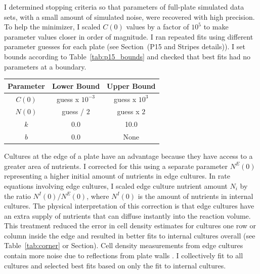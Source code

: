 I determined stopping criteria so that parameters of full-plate
simulated data sets, with a small amount of simulated noise, were
recovered with high precision. To help the minimizer, I scaled
\(C(0)\) values by a factor of \(10^{5}\) to make parameter
values closer in order of magnitude. I ran repeated fits using
different parameter guesses for each plate (see Section~(P15 and
Stripes details)). I set bounds according to
Table~\ref{tab:p15_bounds} and checked that best fits had no
parameters at a boundary.
%

\begin{center}
  \begin{tabular}{| c | c c |}
    \hline
    Parameter        & Lower Bound  & Upper Bound \\
    \hline
    \(C(0)\)     & guess x \(10^{-3}\)  & guess x \(10^{3}\)\\
    \(N(0)\)     & guess / \(2\)  & guess x \(2\)\\
    \(k\)        & 0.0    & 10.0\\
    \(b\)           & 0.0    & None \\
    \hline
  \end{tabular}
  \label{tab:p15_bounds}
\end{center}
%
Cultures at the edge of a plate have an advantage because they have
access to a greater area of nutrients. I corrected for this using a
separate parameter \(N^{E}(0)\) representing a higher initial
amount of nutrients in edge cultures. In rate equations involving edge
cultures, I scaled edge culture nutrient amount \(N_{i}\) by the ratio
\(N^{I}(0)/N^{E}(0)\), where \(N^{I}(0)\) is the amount
of nutrients in internal cultures. The physical interpretation of this
correction is that edge cultures have an extra supply of nutrients
that can diffuse instantly into the reaction volume. This treatment
reduced the error in cell density estimates for cultures one row or
column inside the edge and resulted in better fits to internal
cultures overall (see Table~\ref{tab:corner} or Section). Cell density
measurements from edge cultures contain more noise due to reflections
from plate walls \citep{Lawless2010}. I collectively fit to all
cultures and selected best fits based on only the fit to internal
cultures.


